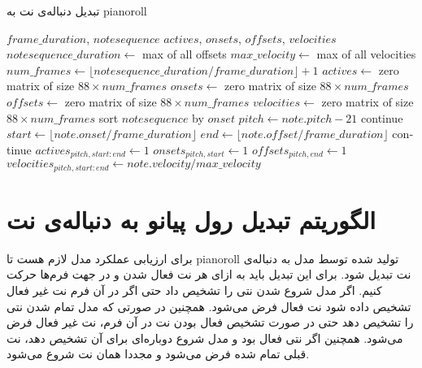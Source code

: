 \begin{algorithm}
\caption{تبدیل دنباله‌ی نت به \gls{pianoroll}}
\begin{algorithmic}
\begin{latin}
    \Require $frame\_duration$, $notesequence$
    \Ensure $actives$, $onsets$, $offsets$, $velocities$
    \State $notesequence\_duration \leftarrow$ max of all offsets
    \State $max\_velocity \leftarrow$ max of all velocities
    \State $num\_frames \leftarrow \lfloor notesequence\_duration / frame\_duration \rfloor + 1$
    \State $actives \leftarrow$ zero matrix of size $88 \times num\_frames$
    \State $onsets \leftarrow$ zero matrix of size $88 \times num\_frames$
    \State $offsets \leftarrow$ zero matrix of size $88 \times num\_frames$
    \State $velocities \leftarrow$ zero matrix of size $88 \times num\_frames$
    \State sort $notesequence$ by $onset$
        \State $pitch \leftarrow note.pitch - 21$
            \State continue
        \EndIf
        \State $start \leftarrow \lfloor note.onset / frame\_duration \rfloor$
        \State $end \leftarrow \lfloor note.offset / frame\_duration \rfloor$
            \State continue
        \EndIf
        \State $actives_{pitch, start:end} \leftarrow 1$
        \State $onsets_{pitch, start} \leftarrow 1$
        \State $offsets_{pitch, end} \leftarrow 1$
        \State $velocities_{pitch, start:end} \leftarrow note.velocity / max\_velocity$
    \EndFor
\end{latin}
\end{algorithmic}
\end{algorithm}

\section{الگوریتم تبدیل رول پیانو به دنباله‌ی نت}
برای ارزیابی عملکرد مدل لازم هست تا \gls{pianoroll} تولید شده توسط مدل به
دنباله‌ی نت تبدیل شود. برای این تبدیل باید به ازای هر نت فعال شدن و در جهت
فرم‌ها حرکت کنیم. اگر مدل شروع شدن نتی را تشخیص داد حتی اگر در آن فرم نت غیر
فعال تشخیص داده شود نت فعال فرض می‌شود. همچنین در صورتی که مدل تمام شدن نتی را
تشخیص دهد حتی در صورت تشخیص فعال بودن نت در آن فرم، نت غیر فعال فرض می‌شود.
همچنین اگر نتی فعال بود و مدل شروع دوباره‌ای برای آن تشخیص دهد، نت قبلی تمام شده
فرض می‌شود و مجددا همان نت شروع می‌شود.

